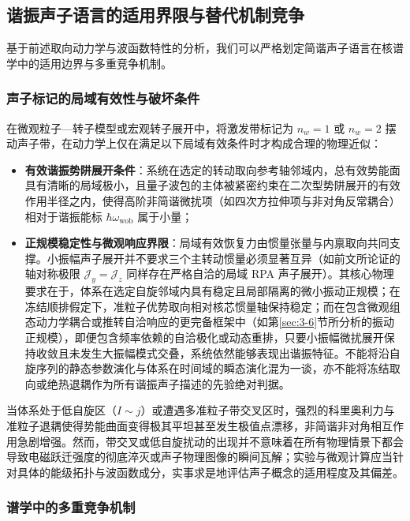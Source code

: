 \subsection{谐振声子语言的适用界限与替代机制竞争}\label{sec:3-4-4}

基于前述取向动力学与波函数特性的分析，我们可以严格划定简谐声子语言在核谱学中的适用边界与多重竞争机制。

\subsubsection{声子标记的局域有效性与破坏条件}

在微观粒子—转子模型或宏观转子展开中，将激发带标记为 $n_w = 1$ 或 $n_w = 2$ 摆动声子带，在动力学上仅在满足以下局域有效条件时才构成合理的物理近似：
\begin{itemize}
\item \textbf{有效谐振势阱展开条件}：系统在选定的转动取向参考轴邻域内，总有效势能面具有清晰的局域极小，且量子波包的主体被紧密约束在二次型势阱展开的有效作用半径之内，使得高阶非简谐微扰项（如四次方拉伸项与非对角反常耦合）相对于谐振能标 $\hbar \omega_{\text{wob}}$ 属于小量；
\item \textbf{正规模稳定性与微观响应界限}：局域有效恢复力由惯量张量与内禀取向共同支撑。小振幅声子展开并不要求三个主转动惯量必须显著互异（如前文所论证的轴对称极限 $\mathcal{J}_y = \mathcal{J}_z$ 同样存在严格自洽的局域 RPA 声子展开）。其核心物理要求在于，体系在选定自旋邻域内具有稳定且局部隔离的微小振动正规模；在冻结顺排假定下，准粒子优势取向相对核芯惯量轴保持稳定；而在包含微观组态动力学耦合或推转自洽响应的更完备框架中（如第\ref{sec:3-6}节所分析的振动正规模），即便包含频率依赖的自洽极化或动态重排，只要小振幅微扰展开保持收敛且未发生大振幅模式交叠，系统依然能够表现出谐振特征。不能将沿自旋序列的静态参数演化与体系在时间域的瞬态演化混为一谈，亦不能将冻结取向或绝热退耦作为所有谐振声子描述的先验绝对判据。
\end{itemize}

当体系处于低自旋区（$I \sim j$）或遭遇多准粒子带交叉区时，强烈的科里奥利力与准粒子退耦使得势能曲面变得极其平坦甚至发生极值点漂移，非简谐非对角相互作用急剧增强。然而，带交叉或低自旋扰动的出现并不意味着在所有物理情景下都会导致电磁跃迁强度的彻底淬灭或声子物理图像的瞬间瓦解；实验与微观计算应当针对具体的能级拓扑与波函数成分，实事求是地评估声子概念的适用程度及其偏差。

\subsubsection{谱学中的多重竞争机制}

